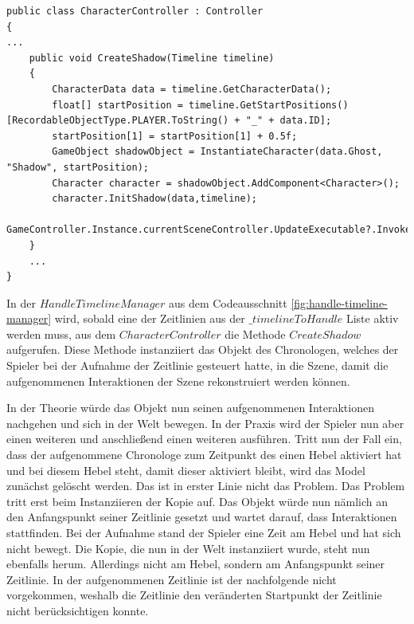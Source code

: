 \begin{lstlisting}[caption={Ausschnitt CharacterController.cs}, label={lst:character-controller}]
public class CharacterController : Controller
{
...
    public void CreateShadow(Timeline timeline)
    {
        CharacterData data = timeline.GetCharacterData();
        float[] startPosition = timeline.GetStartPositions()[RecordableObjectType.PLAYER.ToString() + "_" + data.ID];
        startPosition[1] = startPosition[1] + 0.5f;
        GameObject shadowObject = InstantiateCharacter(data.Ghost, "Shadow", startPosition);
        Character character = shadowObject.AddComponent<Character>();
        character.InitShadow(data,timeline);
        GameController.Instance.currentSceneController.UpdateExecutable?.Invoke();
    }
    ...
}

\end{lstlisting}

In der $HandleTimelineManager$ aus dem Codeausschnitt \ref{fig:handle-timeline-manager} wird, sobald eine der Zeitlinien aus der $\_timelineToHandle$ Liste aktiv werden muss, aus dem $CharacterController$ die Methode $CreateShadow$ aufgerufen. Diese Methode instanziiert das Objekt des Chronologen, welches der Spieler bei der Aufnahme der Zeitlinie gesteuert hatte, in die Szene, damit die aufgenommenen Interaktionen der Szene rekonstruiert werden können.

In der Theorie würde das Objekt nun seinen aufgenommenen Interaktionen nachgehen und sich in der Welt bewegen. 
In der Praxis wird der Spieler nun aber einen weiteren  und anschließend einen weiteren  ausführen. Tritt nun der Fall ein, dass der aufgenommene Chronologe zum Zeitpunkt des  einen Hebel aktiviert hat und bei diesem Hebel steht, damit dieser aktiviert bleibt, wird das Model zunächst gelöscht werden. Das ist in erster Linie nicht das Problem. Das Problem tritt erst beim Instanziieren der Kopie auf. Das Objekt würde nun nämlich an den Anfangspunkt seiner Zeitlinie gesetzt und wartet darauf, dass Interaktionen stattfinden. Bei der Aufnahme stand der Spieler eine Zeit am Hebel und hat sich nicht bewegt. Die Kopie, die nun in der Welt instanziiert wurde, steht nun ebenfalls herum. Allerdings nicht am Hebel, sondern am Anfangspunkt seiner Zeitlinie. In der aufgenommenen Zeitlinie ist der nachfolgende  nicht vorgekommen, weshalb die Zeitlinie den veränderten Startpunkt der Zeitlinie nicht berücksichtigen konnte. 

